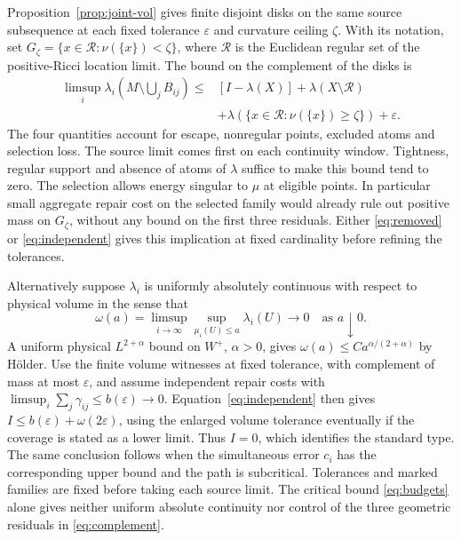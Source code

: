 \documentclass[11pt,letterpaper]{article}
\numberwithin{equation}{section}
\theoremstyle{remark}
\begin{document}
Proposition~\ref{prop:joint-vol} gives finite disjoint disks on
the same source subsequence at each fixed tolerance \(\varepsilon\)
and curvature ceiling \(\zeta\). With its notation, set
\(G_\zeta=\{x\in\mathcal R:\nu(\{x\})<\zeta\}\), where \(\mathcal R\)
is the Euclidean regular set of the positive-Ricci location limit.
The bound on the complement of the disks is
\begin{equation}\label{eq:complement}
\begin{split}
 \limsup_i\lambda_i\!\left(M\setminus\bigcup_j B_{ij}\right)
 \le{}& [I-\lambda(X)]+\lambda(X\setminus\mathcal R)\\
 &+\lambda(\{x\in\mathcal R:\nu(\{x\})\ge\zeta\})+\varepsilon .
\end{split}
\end{equation}
The four quantities account for escape, nonregular points,
excluded atoms and selection loss. The source limit comes first
on each continuity window. Tightness, regular support and absence
of atoms of \(\lambda\) suffice to make this bound tend to zero.
The selection allows energy singular to \(\mu\) at eligible
points. In particular small aggregate repair cost on the selected
family would already rule out positive mass on \(G_\zeta\),
without any bound on the first three residuals. Either
\eqref{eq:removed} or \eqref{eq:independent} gives this implication
at fixed cardinality before refining the tolerances.

Alternatively suppose \(\lambda_i\) is uniformly absolutely
continuous with respect to physical volume in the sense that
\[
 \omega(a)=\limsup_{i\to\infty}\sup_{\mu_i(U)\le a}\lambda_i(U)
 \longrightarrow 0\quad\text{as }a\downarrow0 .
\]
A uniform physical \(L^{2+\alpha}\) bound on \(W^+\), \(\alpha>0\),
gives \(\omega(a)\le C a^{\alpha/(2+\alpha)}\) by H\"older.
Use the finite volume witnesses at fixed tolerance, with complement
of mass at most \(\varepsilon\), and assume independent repair
costs with \(\limsup_i\sum_j\gamma_{ij}\le b(\varepsilon)\to0\).
Equation~\eqref{eq:independent} then gives
\(I\le b(\varepsilon)+\omega(2\varepsilon)\), using the enlarged
volume tolerance eventually if the coverage is stated as a
lower limit. Thus \(I=0\), which identifies the standard type.
The same conclusion follows when the simultaneous error \(c_i\)
has the corresponding upper bound and the path is subcritical.
Tolerances and marked families are fixed before taking each
source limit. The critical bound \eqref{eq:budgets} alone gives
neither uniform absolute continuity nor control of the three
geometric residuals in \eqref{eq:complement}.
\end{document}
